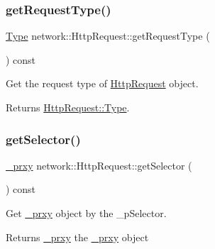 \subsubsection{\texorpdfstring{get\+Request\+Type()}{getRequestType()}\hspace{0.1cm}{\footnotesize\ttfamily [2/2]}}
{\footnotesize\ttfamily \hyperlink{classnetwork_1_1HttpRequest_abcc6d7ee2ea91a721d32fd6d396743fe}{Type} network\+::\+Http\+Request\+::get\+Request\+Type (\begin{DoxyParamCaption}{ }\end{DoxyParamCaption}) const\hspace{0.3cm}{\ttfamily [inline]}}

Get the request type of \hyperlink{classnetwork_1_1HttpRequest}{Http\+Request} object.

\begin{DoxyReturn}{Returns}
\hyperlink{classnetwork_1_1HttpRequest_abcc6d7ee2ea91a721d32fd6d396743fe}{Http\+Request\+::\+Type}. 
\end{DoxyReturn}
\mbox{\label{classnetwork_1_1HttpRequest_abe07bda45e38e73f220bf9eb64ea7f85}} 
\subsubsection{\texorpdfstring{get\+Selector()}{getSelector()}\hspace{0.1cm}{\footnotesize\ttfamily [1/2]}}
{\footnotesize\ttfamily \hyperlink{classnetwork_1_1HttpRequest_1_1__prxy}{\+\_\+prxy} network\+::\+Http\+Request\+::get\+Selector (\begin{DoxyParamCaption}{ }\end{DoxyParamCaption}) const\hspace{0.3cm}{\ttfamily [inline]}}

Get \hyperlink{classnetwork_1_1HttpRequest_1_1__prxy}{\+\_\+prxy} object by the \+\_\+p\+Selector.

\begin{DoxyReturn}{Returns}
\hyperlink{classnetwork_1_1HttpRequest_1_1__prxy}{\+\_\+prxy} the \hyperlink{classnetwork_1_1HttpRequest_1_1__prxy}{\+\_\+prxy} object 
\end{DoxyReturn}
\mbox{\label{classnetwork_1_1HttpRequest_abe07bda45e38e73f220bf9eb64ea7f85}} 
